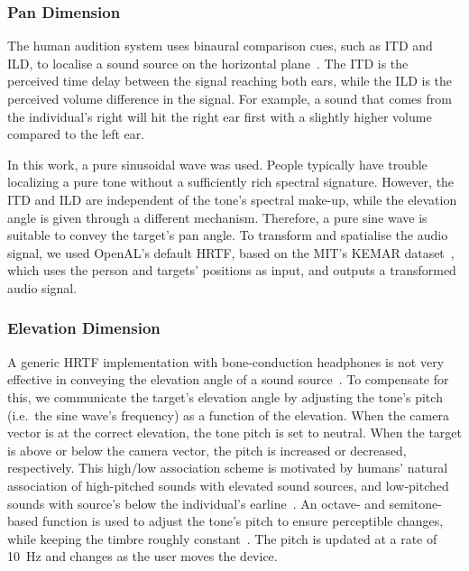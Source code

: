 \documentclass[acmsmall]{acmart}
\begin{document}
\subsubsection{Pan Dimension}

The human audition system uses binaural comparison cues, such as ITD and ILD, to localise a sound source on the horizontal plane~\citep{blauert1969sound,lock2019bone}.
The ITD is the perceived time delay between the signal reaching both ears, while the ILD is the perceived volume difference in the signal.
For example, a sound that comes from the individual's right will hit the right ear first with a slightly higher volume compared to the left ear.

In this work, a pure sinusoidal wave was used. 
People typically have trouble localizing a pure tone without a sufficiently rich spectral signature.
However, the ITD and ILD are independent of the tone's spectral make-up, while the elevation angle is given through a different mechanism.
Therefore, a pure sine wave is suitable to convey the target's pan angle.
To transform and spatialise the audio signal, we used OpenAL's default HRTF, based on the MIT's KEMAR dataset~\citep{hiebert2005openal}, which uses the person and targets' positions as input, and outputs a transformed audio signal.

\subsubsection{Elevation Dimension}

A generic HRTF implementation with bone-conduction headphones is not very effective in conveying the elevation angle of a sound source~\citep{macdonald2006spatial,schonstein2008comparison,lock2019bone}.
To compensate for this, we communicate the target's elevation angle by adjusting the tone's pitch (i.e.\ the sine wave's frequency) as a function of the elevation. 
When the camera vector is at the correct elevation, the tone pitch is set to neutral.
When the target is above or below the camera vector, the pitch is increased or decreased, respectively.
This high/low association scheme is motivated by humans' natural association of high-pitched sounds with elevated sound sources, and low-pitched sounds with source's below the individual's earline~\citep{pratt1930spatial,blauert1997spatial}.
An octave- and semitone-based function is used to adjust the tone's pitch to ensure perceptible changes, while keeping the timbre roughly constant~\citep{shepard1964circularity}.
The pitch is updated at a rate of \SI{10}{\hertz} and changes as the user moves the device.
\end{document}
